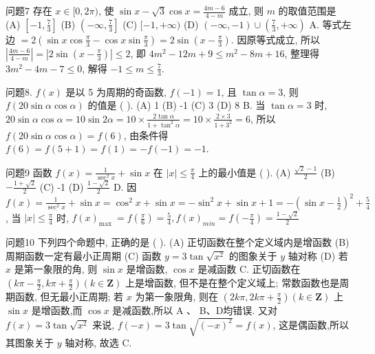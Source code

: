 问题7 存在 $x \in[0,2 \pi)$, 使 $\sin x-\sqrt{3} \cos x=\frac{4 m-6}{4-m}$ 成立, 则 $m$ 的取值范围是
(A) $\left[-1, \frac{7}{3}\right]$
(B) $\left(-\infty, \frac{7}{3}\right]$
(C) $[-1,+\infty)$
(D) $(-\infty,-1) \cup\left(\frac{7}{3},+\infty\right)$
A. 等式左边 $=2\left(\sin x \cos \frac{\pi}{3}-\cos x \sin \frac{\pi}{3}\right)=2 \sin \left(x-\frac{\pi}{3}\right)$. 因原等式成立, 所以 $\left|\frac{4 m-6}{4-m}\right|=\left|2 \sin \left(x-\frac{\pi}{3}\right)\right| \leqslant 2$, 即 $4 m^2-12 m+9 \leqslant m^2- 8 m+16$, 整理得 $3 m^2-4 m-7 \leqslant 0$, 解得 $-1 \leqslant m \leqslant \frac{7}{3}$.



问题8. $f(x)$ 是以 5 为周期的奇函数, $f(-1)=1$, 且 $\tan \alpha=3$, 则 $f(20 \sin \alpha \cos \alpha)$ 的值是 ( ).
(A) 1
(B) -1
(C) 3
(D) 8
B. 当 $\tan \alpha=3$ 时, $20 \sin \alpha \cos \alpha=10 \sin 2 \alpha=10 \times \frac{2 \tan \alpha}{1+\tan ^2 \alpha}=10 \times \frac{2 \times 3}{1+3^2}=6$, 所以 $f(20 \sin \alpha \cos \alpha)=f(6)$, 由条件得 $f(6)=f(5+1)= f(1)=-f(-1)=-1$.



问题9 函数 $f(x)=\frac{1}{\sec ^2 x}+\sin x$ 在 $|x| \leqslant \frac{\pi}{4}$ 上的最小值是 ( ).
(A) $\frac{\sqrt{2}-1}{2}$
(B) $-\frac{1+\sqrt{2}}{2}$
(C) -1
(D) $\frac{1-\sqrt{2}}{2}$
D. 因 $f(x)=\frac{1}{\sec ^2 x}+\sin x=\cos ^2 x+\sin x=-\sin ^2 x+\sin x+1= -\left(\sin x-\frac{1}{2}\right)^2+\frac{5}{4}$, 当 $|x| \leqslant \frac{\pi}{4}$ 时, $f(x)_{\text {max }}=f\left(\frac{\pi}{6}\right)=\frac{5}{4}, f(x)_{min}=f\left(-\frac{\pi}{4}\right)=\frac{1-\sqrt{2}}{2}$



问题10 下列四个命题中, 正确的是 ( ).
(A) 正切函数在整个定义域内是增函数
(B) 周期函数一定有最小正周期
(C) 函数 $y=3 \tan \sqrt{x^2}$ 的图象关于 $y$ 轴对称
(D) 若 $x$ 是第一象限的角, 则 $\sin x$ 是增函数, $\cos x$ 是减函数
C. 正切函数在 $\left(k \pi-\frac{\pi}{2}, k \pi+\frac{\pi}{2}\right)(k \in \mathbf{Z})$ 上是增函数, 但不是在整个定义域上; 常数函数也是周期函数, 但无最小正周期; 若 $x$ 为第一象限角, 则在 $\left(2 k \pi, 2 k \pi+\frac{\pi}{2}\right)(k \in \mathbf{Z})$ 上 $\sin x$ 是增函数,而 $\cos x$ 是减函数,所以 $\mathrm{A}$ 、 B、D均错误.
又对 $f(x)=3 \tan \sqrt{x^2}$ 来说, $f(-x)=3 \tan \sqrt{(-x)^2}=f(x)$, 这是偶函数,所以其图象关于 $y$ 轴对称, 故选 C.



